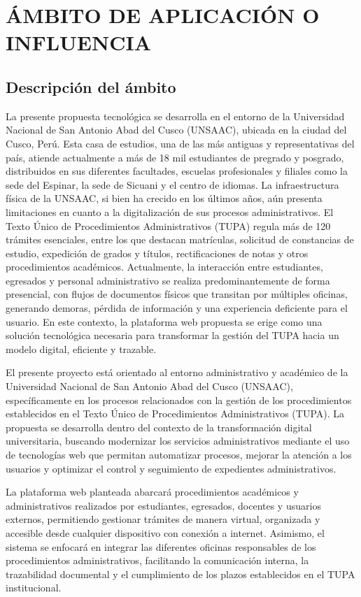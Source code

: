\newpage
\chapter{ÁMBITO DE APLICACIÓN O INFLUENCIA}

\section{Descripción del ámbito}

La presente propuesta tecnológica se desarrolla en el entorno de la Universidad Nacional de San Antonio 
Abad del Cusco (UNSAAC), ubicada en la ciudad del Cusco, Perú. Esta casa de estudios, una de las más 
antiguas y representativas del país, atiende actualmente a más de 18 mil estudiantes de pregrado y 
posgrado, distribuidos en sus diferentes facultades, escuelas profesionales y filiales como la sede 
del Espinar, la sede de Sicuani y el centro de idiomas. La infraestructura física de la UNSAAC, si 
bien ha crecido en los últimos años, aún presenta limitaciones en cuanto a la digitalización de sus 
procesos administrativos. El Texto Único de Procedimientos Administrativos (TUPA) regula más de 120 
trámites esenciales, entre los que destacan matrículas, solicitud de constancias de estudio, expedición 
de grados y títulos, rectificaciones de notas y otros procedimientos académicos. Actualmente, la 
interacción entre estudiantes, egresados y personal administrativo se realiza predominantemente de 
forma presencial, con flujos de documentos físicos que transitan por múltiples oficinas, generando 
demoras, pérdida de información y una experiencia deficiente para el usuario. En este contexto, la 
plataforma web propuesta se erige como una solución tecnológica necesaria para transformar la gestión 
del TUPA hacia un modelo digital, eficiente y trazable.

El presente proyecto está orientado al entorno administrativo y académico de la Universidad Nacional 
de San Antonio Abad del Cusco (UNSAAC), específicamente en los procesos relacionados con la gestión 
de los procedimientos establecidos en el Texto Único de Procedimientos Administrativos (TUPA). 
La propuesta se desarrolla dentro del contexto de la transformación digital universitaria, 
buscando modernizar los servicios administrativos mediante el uso de tecnologías web que permitan 
automatizar procesos, mejorar la atención a los usuarios y optimizar el control y seguimiento de 
expedientes administrativos.

La plataforma web planteada abarcará procedimientos académicos y administrativos realizados por 
estudiantes, egresados, docentes y usuarios externos, permitiendo gestionar trámites de manera 
virtual, organizada y accesible desde cualquier dispositivo con conexión a internet. Asimismo, 
el sistema se enfocará en integrar las diferentes oficinas responsables de los procedimientos 
administrativos, facilitando la comunicación interna, la trazabilidad documental y el cumplimiento 
de los plazos establecidos en el TUPA institucional.

